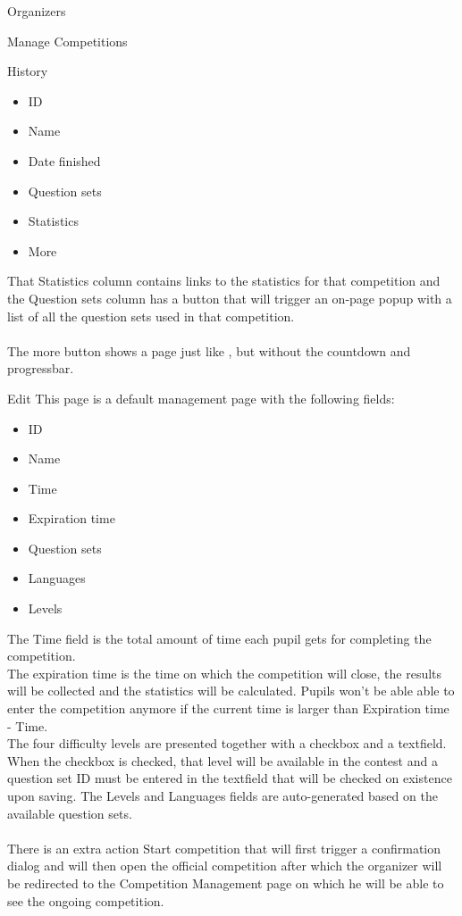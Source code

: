 \begin{section}{Organizers}
\begin{subsection}{Manage Competitions}
\begin{subsubsection}{History}
\begin{itemize}
				\item ID
				\item Name
				\item Date finished
				\item Question sets
				\item Statistics
				\item More
			\end{itemize}
			That Statistics column contains links to the statistics for that competition and the
			Question sets column has a button that will trigger an on-page popup with a
			list of all the question sets used in that competition.\\
			\\
			The more button shows a page just like , but
			without the countdown and progressbar.
		\end{subsubsection}
		
		\begin{subsubsection}{Edit}
			This page is a default management page with the following fields:
			\begin{itemize}
				\item ID
				\item Name
				\item Time
				\item Expiration time
				\item Question sets
				\item Languages
				\item Levels
			\end{itemize}
			The Time field is the total amount of time each pupil gets for completing
			the competition.\\
			The expiration time is the time on which the competition will close,
			the results will be collected and the statistics will be calculated.
			Pupils won't be able able to enter the competition anymore if the
			current time is larger than Expiration time - Time.\\
			The four difficulty levels are presented together with a checkbox and a
			textfield. When the checkbox is checked, that level will be available in the
			contest and a question set ID must be entered in the textfield that will be
			checked on existence upon saving.
			The Levels and Languages fields are auto-generated based on the
			available question sets. \\
			\\
			There is an extra action Start competition that will first trigger a
			confirmation dialog and will then open the official competition after which
			the organizer will be redirected to the Competition Management page on which
			he will be able to see the ongoing competition.
		\end{subsubsection}
	\end{subsection}
\end{section}